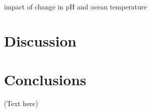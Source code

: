 \documentclass[default,jgrga]{agutex2015}
\begin{document}
\begin{article}
impact of change in pH and ocean temperature

\section{Discussion}


\section{Conclusions}


%
%
%
%
%
%
%

\begin{acknowledgments}
(Text here)
\end{acknowledgments}

%
%
%
%
%
%
%
%
%


\end{article}
\end{document}

